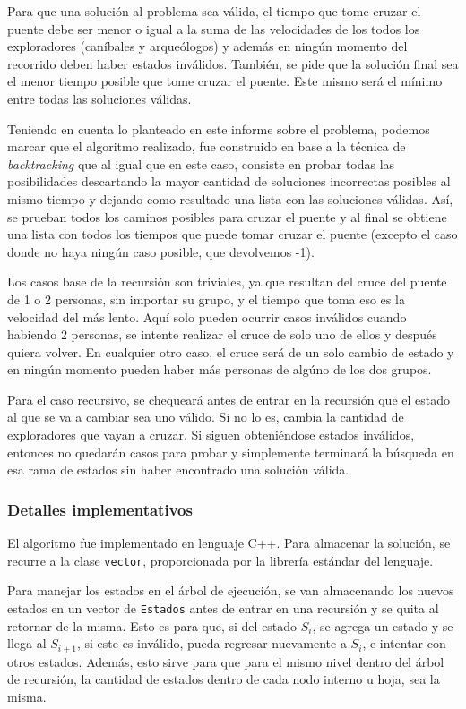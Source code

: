         Para que una solución al problema sea válida, el tiempo que tome cruzar el puente debe ser menor o igual a la suma de las velocidades de los todos los exploradores (caníbales y arqueólogos) y además en ningún momento del recorrido deben haber estados inválidos. También, se pide que la solución final sea el menor tiempo posible que tome cruzar el puente. Este mismo será el mínimo entre todas las soluciones válidas.

        Teniendo en cuenta lo planteado en este informe sobre el problema, podemos marcar que el algoritmo realizado, fue construido en base a la técnica de \emph{backtracking} que al igual que en este caso, consiste en probar todas las posibilidades descartando la mayor cantidad de soluciones incorrectas posibles al mismo tiempo y dejando como resultado una lista con las soluciones válidas. Así, se prueban todos los caminos posibles para cruzar el puente y al final se obtiene una lista con todos los tiempos que puede tomar cruzar el puente (excepto el caso donde no haya ningún caso posible, que devolvemos -1).

        Los casos base de la recursión son triviales, ya que resultan del cruce del puente de 1 o 2 personas, sin importar su grupo, y el tiempo que toma eso es la velocidad del más lento. Aquí solo pueden ocurrir casos inválidos cuando habiendo 2 personas, se intente realizar el cruce de solo uno de ellos y después quiera volver. En cualquier otro caso, el cruce será de un solo cambio de estado y en ningún momento pueden haber más personas de algúno de los dos grupos.

        Para el caso recursivo, se chequeará antes de entrar en la recursión que el estado al que se va a cambiar sea uno válido. Si no lo es, cambia la cantidad de exploradores que vayan a cruzar. Si siguen obteniéndose estados inválidos, entonces no quedarán casos para probar y simplemente terminará la búsqueda en esa rama de estados sin haber encontrado una solución válida.



        \subsubsection{Detalles implementativos}
            El algoritmo fue implementado en lenguaje C++. Para almacenar la solución, se recurre a la clase \texttt{vector}, proporcionada por la librería estándar del lenguaje.

            Para manejar los estados en el árbol de ejecución, se van almacenando los nuevos estados en un vector de \texttt{Estados} antes de entrar en una recursión y se quita al retornar de la misma. Esto es para que, si del estado $S_{i}$, se agrega un estado y se llega al $S_{i+1}$, si este es inválido, pueda regresar nuevamente a $S_{i}$, e intentar con otros estados. Además, esto sirve para que para el mismo nivel dentro del árbol de recursión, la cantidad de estados dentro de cada nodo interno u hoja, sea la misma.

